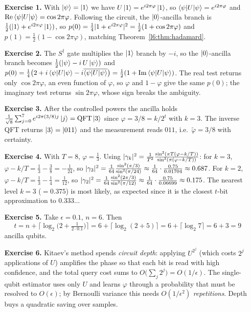 \begin{solution}
\textbf{Exercise 1.} With $\ket{\psi}=\ket{1}$ we have $U\ket{1}
=e^{i2\pi\varphi}\ket{1}$, so $\braket{\psi|U|\psi}=e^{i2\pi\varphi}$ and
$\mathrm{Re}\braket{\psi|U|\psi}=\cos2\pi\varphi$. Following the circuit,
the $\ket{0}$-ancilla branch is $\tfrac12(\ket{1}+e^{i2\pi\varphi}\ket{1})$,
so $p(0)=\tfrac14\lvert1+e^{i2\pi\varphi}\rvert^{2}=\tfrac12(1+\cos2\pi\varphi)$ and
$p(1)=\tfrac12(1-\cos2\pi\varphi)$, matching Theorem~\ref{l6:thm:hadamard}.

\textbf{Exercise 2.} The $S^{\dagger}$ gate multiplies the $\ket{1}$ branch by
$-i$, so the $\ket{0}$-ancilla branch becomes
$\tfrac12(\ket{\psi}-i\,U\ket{\psi})$ and $p(0)=\tfrac14\big(2
+i\braket{\psi|U|\psi}-i\overline{\braket{\psi|U|\psi}}\big)
=\tfrac12(1+\mathrm{Im}\braket{\psi|U|\psi})$. The real test returns only
$\cos2\pi\varphi$, an even function of $\varphi$, so $\varphi$ and $1-\varphi$
give the same $p(0)$; the imaginary test returns $\sin2\pi\varphi$, whose sign
breaks the ambiguity.

\textbf{Exercise 3.} After the controlled powers the ancilla holds
$\tfrac{1}{\sqrt8}\sum_{j=0}^{7}e^{i2\pi(3/8)j}\ket{j}=\mathrm{QFT}\ket{3}$ since
$\varphi=3/8=k/2^{t}$ with $k=3$. The inverse QFT returns $\ket{3}=\ket{011}$
and the measurement reads $011$, i.e.\ $\tilde\varphi=3/8$ with certainty.

\textbf{Exercise 4.} With $T=8$, $\varphi=\tfrac13$. Using
$\lvert\gamma_{k}\rvert^{2}=\tfrac{1}{T^{2}}\frac{\sin^{2}(\pi T(\varphi-k/T))}
{\sin^{2}(\pi(\varphi-k/T))}$: for $k=3$,
$\varphi-k/T=\tfrac13-\tfrac38=-\tfrac{1}{24}$, so
$\lvert\gamma_3\rvert^{2}=\tfrac{1}{64}\frac{\sin^2(\pi/3)}{\sin^2(\pi/24)}
\approx\tfrac{1}{64}\cdot\frac{0.75}{0.01704}\approx0.687$.
For $k=2$, $\varphi-k/T=\tfrac13-\tfrac14=\tfrac{1}{12}$, so
$\lvert\gamma_2\rvert^{2}=\tfrac{1}{64}\frac{\sin^2(2\pi/3)}{\sin^2(\pi/12)}
\approx\tfrac{1}{64}\cdot\frac{0.75}{0.06699}\approx0.175$.
The nearest level $k=3$ ($=0.375$) is most likely, as expected since it is the
closest $t$-bit approximation to $0.333\ldots$

\textbf{Exercise 5.} Take $\epsilon=0.1$, $n=6$. Then
\[
  t=n+\big\lceil\log_2\big(2+\tfrac{1}{2\cdot0.1}\big)\big\rceil
   =6+\lceil\log_2(2+5)\rceil=6+\lceil\log_2 7\rceil=6+3=9
\]
ancilla qubits.

\textbf{Exercise 6.} Kitaev's method spends \emph{circuit depth}: applying
$U^{2^{j}}$ (which costs $2^{j}$ applications of $U$) amplifies the phase so that
each bit is read with high confidence, and the total query cost sums to
$O\big(\sum_j 2^j\big)=O(1/\epsilon)$. The single-qubit estimator uses only $U$
and learns $\varphi$ through a probability that must be resolved to
$O(\epsilon)$; by Bernoulli variance this needs $O(1/\epsilon^2)$
\emph{repetitions}. Depth buys a quadratic saving over samples.


\end{solution}
